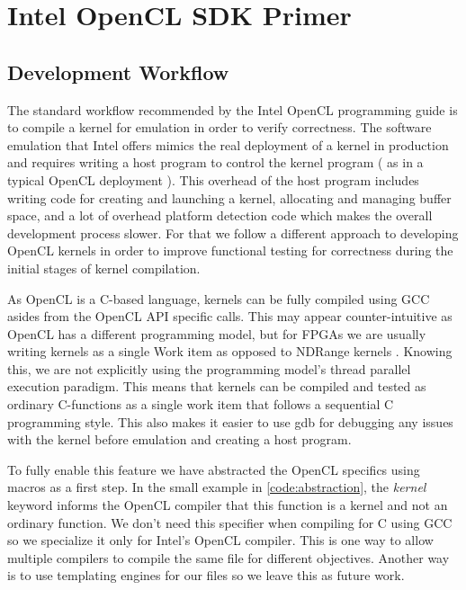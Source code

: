
\chapter{Intel OpenCL SDK Primer} %

\label{Chapter5} %


\section{Development Workflow}

The standard workflow recommended by the Intel OpenCL programming guide\cite{progguide} is to compile a kernel for emulation in order to verify correctness. The software emulation that Intel offers mimics the real deployment of a kernel in production and requires writing a host program to control the kernel program ( as in a typical OpenCL deployment ). This overhead of the host program includes writing code for creating and launching a kernel, allocating and managing buffer space, and a lot of overhead platform detection code which makes the overall development process slower. For that we follow a different approach to developing OpenCL kernels in order to improve functional testing for correctness during the initial stages of kernel compilation.

 As OpenCL is a C-based language, kernels can be fully compiled using GCC asides from the OpenCL  API specific calls. This may appear counter-intuitive as OpenCL has a different programming model, but for FPGAs we are usually writing kernels as a single Work item as opposed to NDRange kernels \cite{opencl}. Knowing this, we are not explicitly using the programming model’s thread parallel execution paradigm. This means that kernels can be compiled and tested as ordinary C-functions as a single work item that follows a sequential C programming style. This also makes it easier to use gdb for debugging any issues with the kernel before emulation and creating a host program. 
 
 To fully enable this feature we have abstracted the OpenCL specifics using macros as a first step. In the small example in \ref{code:abstraction}, the \emph{kernel} keyword informs the OpenCL compiler that this function is a kernel and not an ordinary function. We don't need this specifier when compiling for C using GCC so we specialize it only for Intel's OpenCL compiler. This is one way to allow multiple compilers to compile the same file for different objectives. Another way is to use templating engines for our files so we leave this as future work.
 
